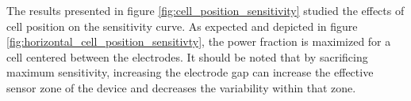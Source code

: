 
\par The results presented in figure \ref{fig:cell_position_sensitivity} studied the effects of cell position on the sensitivity curve. As expected and depicted in figure \ref{fig:horizontal_cell_position_sensitivty}, the power fraction is maximized for a cell centered between  the electrodes. It should be noted that by sacrificing maximum sensitivity, increasing the electrode gap can increase the effective sensor zone of the device and decreases the variability within that zone.

